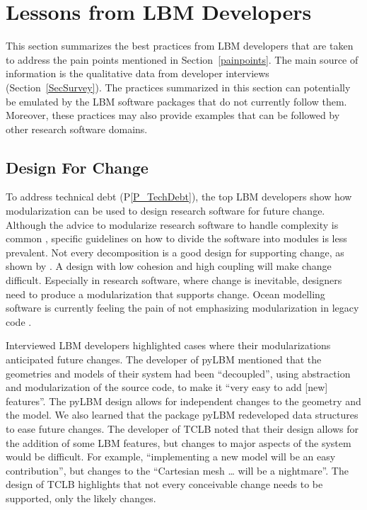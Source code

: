 \documentclass[final, 3p, times, authoryear]{elsarticle}
\newcommand{\ppref}[1]{P\ref{#1}}
\begin{document}
\section{Lessons from LBM Developers} \label{Sec_AddressConcerns}

This section summarizes the best practices from LBM developers that are taken to
address the pain points mentioned in Section~\ref{painpoints}.  The main source
of information is the qualitative data from developer interviews
(Section~\ref{SecSurvey}).  The practices summarized in this section can
potentially be emulated by the LBM software packages that do not currently
follow them.  Moreover, these practices may also provide examples that can be
followed by other research software domains.

\subsection{Design For Change} \label{Sec_DesForChange}

To address technical debt (\ppref{P_TechDebt}), the top LBM developers show how
modularization can be used to design research software for future change.
Although the advice to modularize research software to handle complexity is
common \citep{WilsonEtAl2014, StewartEtAl2017, Storer2017}, specific guidelines
on how to divide the software into modules is less prevalent.  Not every
decomposition is a good design for supporting change, as shown by
\citet{Parnas1972a}.  A design with low cohesion and high coupling \citep[p.\
48]{GhezziEtAl2003} will make change difficult. Especially in research software,
where change is inevitable, designers need to produce a modularization that
supports change. Ocean modelling software is currently feeling the pain of
not emphasizing modularization in legacy code \citep{JungEtAl2022}.

Interviewed LBM developers highlighted cases where their modularizations
anticipated future changes.  The developer of pyLBM mentioned that the
geometries and models of their system had been ``decoupled'', using abstraction
and modularization of the source code, to make it ``very easy to add [new]
features''.  The pyLBM design allows for independent changes to the geometry and
the model.  We also learned that the package pyLBM redeveloped data structures
to ease future changes. The developer of TCLB noted that their design allows for
the addition of some LBM features, but changes to major aspects of the system
would be difficult. For example, ``implementing a new model will be an easy
contribution'', but changes to the ``Cartesian mesh … will be a nightmare''.
The design of TCLB highlights that not every conceivable change needs to be
supported, only the likely changes.
\end{document}
